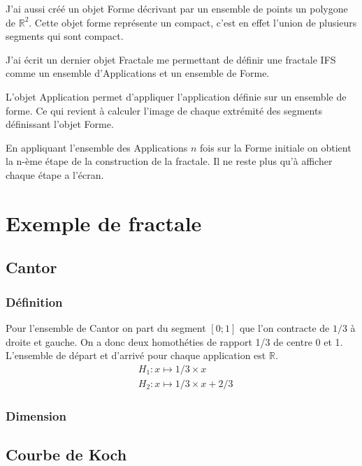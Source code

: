 \documentclass[a4paper, 12pt]{report}
\begin{document}
			
			J'ai aussi créé un objet Forme décrivant par un ensemble de points un polygone de $\mathds{R}^2$. Cette objet forme représente un compact, c'est en effet l'union de plusieurs segments qui sont compact.
			
			
			J'ai écrit un dernier objet Fractale me permettant de définir une fractale IFS comme un ensemble d'Applications et un ensemble de Forme.
			
			
			L'objet Application permet d'appliquer l'application définie sur un ensemble de forme. Ce qui revient à calculer l'image de chaque extrémité des segments définissant l'objet Forme.
	
			
			En appliquant l'ensemble des Applications $n$ fois sur la Forme initiale on obtient la n-ème étape de la construction de la fractale. Il ne reste plus qu'à afficher chaque étape a l'écran.
	\chapter{\bf Exemple de fractale}
		\section{Cantor}
			\subsection{Définition}
				Pour l'ensemble de Cantor on part du segment $[0;1]$ que l'on contracte de $1/3$ à droite et gauche.
				On a donc deux homothéties de rapport 1/3 de centre 0 et 1. L'ensemble de départ et d'arrivé pour chaque application est $\mathds{R}.$ 
				\begin{align*}
					&H_1:x\mapsto 1/3\times x\\
					&H_2:x\mapsto 1/3\times x+2/3
				\end{align*}
			\subsection{Dimension}
			
		\section{Courbe de Koch}
\end{document}
